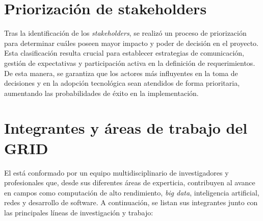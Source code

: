 \section{Priorización de stakeholders}
Tras la identificación de los \textit{stakeholders}, se realizó un proceso de priorización para determinar cuáles poseen mayor impacto y poder de decisión en el proyecto. Esta clasificación resulta crucial para establecer estrategias de comunicación, gestión de expectativas y participación activa en la definición de requerimientos. De esta manera, se garantiza que los actores más influyentes en la toma de decisiones y en la adopción tecnológica sean atendidos de forma prioritaria, aumentando las probabilidades de éxito en la implementación.  



\section{Integrantes y áreas de trabajo del GRID}
El \GRID está conformado por un equipo multidisciplinario de investigadores y profesionales que, desde sus diferentes áreas de experticia, contribuyen al avance en campos como computación de alto rendimiento, \textit{big data}, inteligencia artificial, redes y desarrollo de software. A continuación, se listan sus integrantes junto con las principales líneas de investigación y trabajo:  

